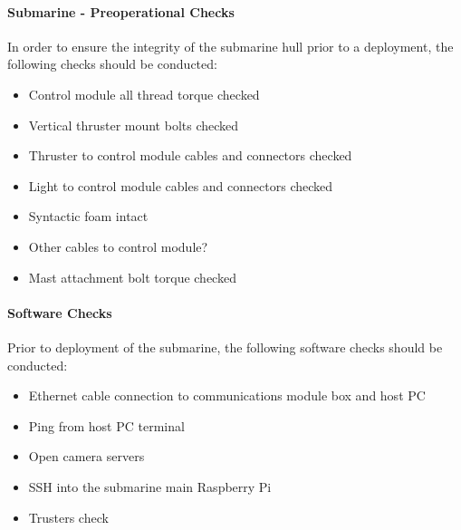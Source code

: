 \documentclass[
10pt, %
a4paper, %
oneside, %
headinclude,footinclude, %
BCOR5mm, %
]{scrartcl}
\begin{document}
\paragraph{Submarine - Preoperational Checks} In order to ensure the integrity of the submarine hull prior to a deployment, the following checks should be conducted:

\begin{itemize}[noitemsep] %
	\item Control module all thread torque checked
	\item Vertical thruster mount bolts checked
	\item Thruster to control module cables and connectors checked
	\item Light to control module cables and connectors checked
	\item Syntactic foam intact
	\item Other cables to control module?
	\item Mast attachment bolt torque checked
\end{itemize}

\paragraph{Software Checks} Prior to deployment of the submarine, the following software checks should be conducted:

\begin{itemize}[noitemsep] %
	\item Ethernet cable connection to communications module box and host PC
	\item Ping from host PC terminal
	\item Open camera servers
	\item SSH into the submarine main Raspberry Pi
	\item Trusters check
\end{itemize}
\end{document}
